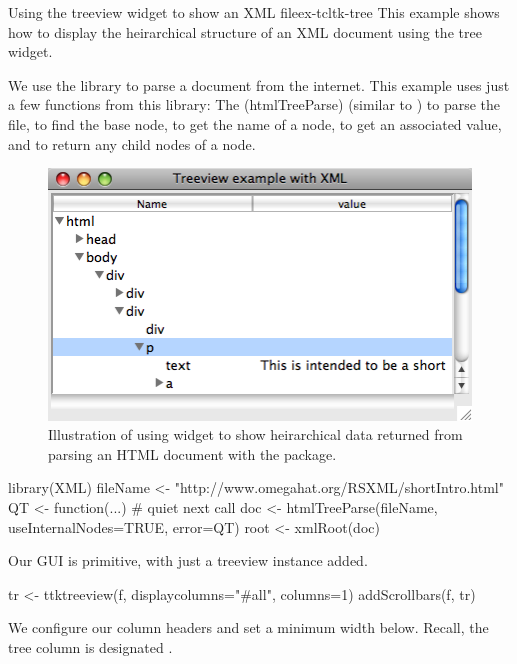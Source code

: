 \begin{example}{Using the treeview widget to show an XML file}{ex-tcltk-tree}
This example shows how to display the heirarchical structure of an XML
document using the tree widget.

We use the  library to parse a document from the
internet. This example uses just a few functions from this library:
The \function(htmlTreeParse) (similar to ) to parse the file, 
 to find the base node,
 to get the name of a node, 
 to get an associated value, and
 to return any child nodes of a node.



\begin{figure}
  \centering
  \includegraphics[width=.7\textwidth]{fig-tcltk-xml-viewer.png}
  \caption{Illustration of using  widget to show
    heirarchical data returned from parsing an HTML document with the
     package.}
  \label{fig:fig-tcltk-xml-viewer}
\end{figure}
\begin{Schunk}
\begin{Sinput}
 library(XML)
 fileName <- "http://www.omegahat.org/RSXML/shortIntro.html"
 QT <- function(...) {}  # quiet next call
 doc <- htmlTreeParse(fileName, useInternalNodes=TRUE, error=QT)
 root <- xmlRoot(doc)
\end{Sinput}
\end{Schunk}
Our GUI is primitive, with just a treeview instance added.
\begin{Schunk}
\begin{Sinput}
 tr <- ttktreeview(f, displaycolumns="#all", columns=1)
 addScrollbars(f, tr)                    
\end{Sinput}
\end{Schunk}

We configure our column headers and set a minimum
width below. Recall, the tree column is designated .
\begin{Schunk}
\end{Schunk}


\end{example}
